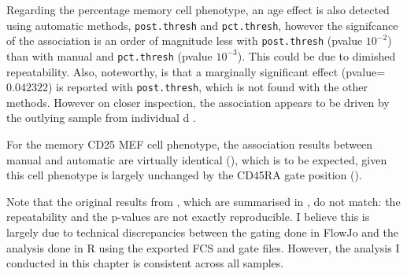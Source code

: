 Regarding the percentage memory cell phenotype,
an age effect is also detected using automatic methods, \texttt{post.thresh} and \texttt{pct.thresh}, however the signifcance of the association 
is an order of magnitude less with \texttt{post.thresh} (pvalue $10^{-2}$) than with manual and \texttt{pct.thresh} (pvalue $10^{-3}$).
This could be due to dimished repeatability.
Also, noteworthy, is that a marginally significant  effect (pvalue=$0.042322$) is reported with \texttt{post.thresh}, which is not found with the
other methods.  
However on closer inspection, the association appears to be driven by the outlying sample from individual d .

For the memory CD25 MEF cell phenotype, the association results between manual and automatic are virtually identical (),
which is to be expected, given this cell phenotype is largely unchanged by the CD45RA gate position ().

Note that the original results from \citet{Dendrou:2009dv}, which are summarised in ,
do not match: the repeatability and the p-values are not exactly reproducible.
I believe this is largely due to technical discrepancies between the gating done in FlowJo and the
analysis done in R using the exported FCS and gate files.
However, the analysis I conducted in this chapter is consistent across all samples.



